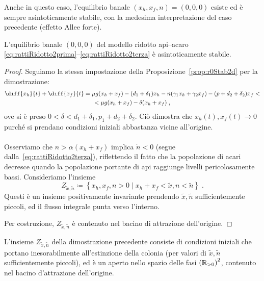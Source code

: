 Anche in questo caso, l'equilibrio banale $(x_h, x_f, n)=(0,0,0)$ esiste ed è sempre asintoticamente stabile, con la medesima interpretazione del caso precedente (effetto Allee forte).

\begin{proposizione}
L'equilibrio banale $(0,0,0)$ del modello ridotto
api--acaro \eqref{eq:rattiRidotto2prima}--\eqref{eq:rattiRidotto2terza}
è asintoticamente stabile.
\end{proposizione}

\begin{proof}
Seguiamo la stessa impostazione della Proposizione~\ref{prop:r0Stab2d} per la dimostrazione:
\begin{multline*}
\diff{x_h}{t} + \diff{x_f}{t} = \mu g (x_h + x_f) - (d_1 +\delta_1) x_h
- n( \gamma_1 x_h + \gamma_2 x_f ) - (p + d_2 + \delta_2) x_f < \\
< \mu g(x_h +x_f) - \delta (x_h + x_f) \; ,
\end{multline*}
ove si è preso $0< \delta < d_1 + \delta_1 , p_1 + d_2 + \delta_2$.
Ciò dimostra che $x_h(t), x_f(t) \to 0$ purché si prendano condizioni iniziali abbastanza vicine all'origine.

\paragraph{}
Osserviamo che $n > \alpha (x_h + x_f)$ implica $\dot{n} <0$ (segue dalla~\ref{eq:rattiRidotto2terza}),
riflettendo il fatto che la popolazione di acari decresce quando la popolazione portante di api
raggiunge livelli pericolosamente bassi. Consideriamo l'insieme
$$Z_{\tilde{x}, \tilde{n}} \coloneq \left\{ x_h, x_f, n > 0 \; | \; x_h + x_f < \tilde{x}, n < \tilde{n} \right\} \; .$$
Questi è un insieme positivamente invariante prendendo $\tilde{x}, \tilde{n}$ sufficientemente piccoli,
ed il flusso integrale punta verso l'interno.

Per costruzione, $Z_{\tilde{x}, \tilde{n}}$ è contenuto nel bacino di attrazione dell'origine.
\end{proof}

L'insieme $Z_{\tilde{x}, \tilde{n}}$ della dimostrazione precedente consiste di condizioni iniziali
che portano inesorabilmente all'estinzione della colonia
(per valori di $\tilde{x}, \tilde{n}$ sufficientemente piccoli),
ed è un aperto nello spazio delle fasi $\left( \mathbb{R}_{>0} \right)^2$, contenuto nel bacino
d'attrazione dell'origine.

